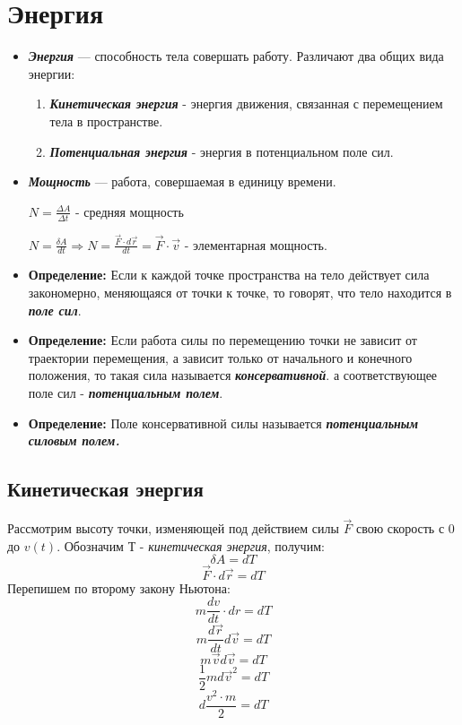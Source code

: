 \documentclass[../main.tex]{subfiles}
\begin{document}
\section{Энергия}
\begin{itemize}
    \item {} \textbf{\textit{Энергия}} --- способность тела совершать работу.
          Различают два общих вида энергии:
          \begin{enumerate}
              \item {} \textbf{\textit{Кинетическая энергия}} - энергия движения, связанная с перемещением тела в пространстве.
              \item {} \textbf{\textit{Потенциальная энергия}} - энергия в потенциальном поле сил.
          \end{enumerate}

    \item {} \textbf{\textit{Мощность}} --- работа, совершаемая в единицу времени.

          $N = \frac{\Delta A}{\Delta t}$ - средняя мощность

          $N = \frac{\delta A}{dt} \Rightarrow N = \frac{\vec F \cdot d\vec r}{dt} = \vec F \cdot \vec v$ - элементарная мощность.

    \item \textbf{Определение:} Если к каждой точке пространства на тело действует сила закономерно, меняющаяся от точки к точке, то говорят, что тело находится в \textbf{\textit{поле сил}}.

    \item \textbf{Определение:} Если работа силы по перемещению точки не зависит от траектории перемещения, а зависит только от начального и конечного положения, то такая сила называется \textbf{\textit{консервативной}}. а соответствующее поле сил - \textbf{\textit{потенциальным полем}}.

    \item \textbf{Определение:} Поле консервативной силы называется \textbf{\textit{потенциальным силовым полем.}}
\end{itemize}
\subsection{Кинетическая энергия}

Рассмотрим высоту точки, изменяющей под действием силы $\vec F$ свою скорость с 0 до $v(t)$. Обозначим Т - \textit{кинетическая энергия}, получим:
\[ \delta A = dT \]
\[ \vec F \cdot d \vec r  = dT\]
Перепишем по второму закону Ньютона:
\[ m\frac{dv}{dt} \cdot dr = dT \]
\[ m\frac{d \vec r}{dt} d\vec v = dT \] \[ m \vec v d \vec v = dT \]
\[ \frac{1}{2}md \vec v^2 = dT \]
\[ d\frac{v^2 \cdot m}{2} = dT\]
\end{document}
